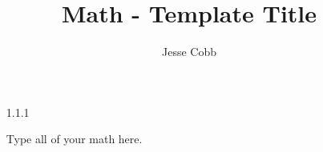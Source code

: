 \documentclass[11pt]{amsart}
\theoremstyle{definition}
\begin{document}
\title{Math - Template Title}

\author{Jesse Cobb}

\maketitle

\begin{itemize}

\item[1.1.1]

Type all of your math here.

\end{itemize}
\end{document}
